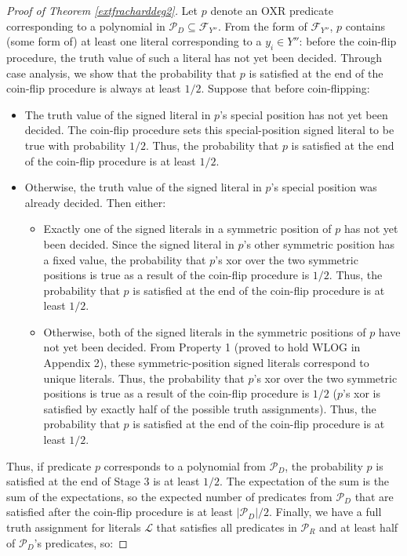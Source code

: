 \documentclass{article}
\begin{document}
\begin{proof}[Proof of Theorem \ref{extfracharddeg2}]
Let $p$ denote an OXR predicate corresponding to a polynomial in $\mathcal{P}_D\subseteq \mathcal{F}_{Y''}$. From the form of $\mathcal{F}_{Y''}$,  $p$ contains (some form of) at least one literal corresponding to a $y_i\in Y''$: before the coin-flip procedure, the truth value of such a literal has not yet been decided. Through case analysis, we show that the probability that $p$ is satisfied at the end of the coin-flip procedure is always at least $1/2$.
Suppose that before coin-flipping:
\begin{itemize}
\item The truth value of the signed literal in $p$'s special position has not yet been decided. The coin-flip procedure sets this special-position signed literal to be true with probability $1/2$. Thus, the probability that $p$ is satisfied at the end of the coin-flip procedure is at least $1/2$. 
\item Otherwise, the truth value of the signed literal in $p$'s special position was already decided. Then either:

\vspace{-3mm}

\begin{itemize}
\item Exactly one of the signed literals in a symmetric position of $p$ has not yet been decided. Since the signed literal in $p$'s other symmetric position has a fixed value, the probability that $p$'s xor over the two symmetric positions is true as a result of the coin-flip procedure is $1/2$. Thus, the probability that $p$ is satisfied at the end of the coin-flip procedure is at least $1/2$. 
\item Otherwise, both of the signed literals in the symmetric positions of $p$ have not yet been decided. From Property 1 (proved to hold WLOG in Appendix 2), these symmetric-position signed literals correspond to unique literals. Thus, the probability that $p$'s xor over the two symmetric positions is true as a result of the coin-flip procedure is $1/2$ ($p$'s xor is satisfied by exactly half of the possible truth assignments). Thus, the probability that $p$ is satisfied at the end of the coin-flip procedure is at least $1/2$. 
\end{itemize}
\end{itemize}

\vspace{-3mm}

\noindent Thus, if predicate $p$ corresponds to a polynomial from $ \mathcal{P}_D$, the probability $p$ is satisfied at the end of Stage 3 is at least $1/2$. The expectation of the sum is the sum of the expectations, so  the expected number of predicates from  $\mathcal{P}_D$ that are satisfied after the coin-flip procedure is at least $|\mathcal{P}_D|/2$. Finally, we have a full truth assignment for literals $\mathcal{L}$ that satisfies all predicates in $\mathcal{P}_R$ and at least half of $\mathcal{P}_D$'s predicates, so:




\end{proof}
\end{document}
